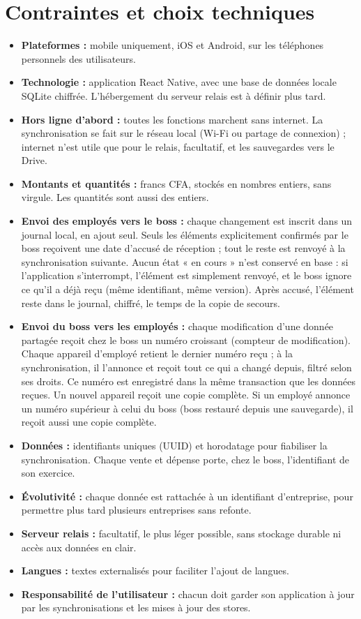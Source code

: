 \documentclass[11pt,a4paper]{article}
\begin{document}
	\section{Contraintes et choix techniques}
	\begin{itemize}[leftmargin=*]
		\item \textbf{Plateformes :} mobile uniquement, iOS et Android, sur les téléphones personnels des utilisateurs.
		\item \textbf{Technologie :} application React Native, avec une base de données locale SQLite chiffrée. L'hébergement du serveur relais est à définir plus tard.
		\item \textbf{Hors ligne d'abord :} toutes les fonctions marchent sans internet. La synchronisation se fait sur le réseau local (Wi-Fi ou partage de connexion) ; internet n'est utile que pour le relais, facultatif, et les sauvegardes vers le Drive.
		\item \textbf{Montants et quantités :} francs CFA, stockés en nombres entiers, sans virgule. Les quantités sont aussi des entiers.
		\item \textbf{Envoi des employés vers le boss :} chaque changement est inscrit dans un journal local, en ajout seul. Seuls les éléments explicitement confirmés par le boss reçoivent une date d'accusé de réception ; tout le reste est renvoyé à la synchronisation suivante. Aucun état « en cours » n'est conservé en base : si l'application s'interrompt, l'élément est simplement renvoyé, et le boss ignore ce qu'il a déjà reçu (même identifiant, même version). Après accusé, l'élément reste dans le journal, chiffré, le temps de la copie de secours.
		\item \textbf{Envoi du boss vers les employés :} chaque modification d'une donnée partagée reçoit chez le boss un numéro croissant (compteur de modification). Chaque appareil d'employé retient le dernier numéro reçu ; à la synchronisation, il l'annonce et reçoit tout ce qui a changé depuis, filtré selon ses droits. Ce numéro est enregistré dans la même transaction que les données reçues. Un nouvel appareil reçoit une copie complète. Si un employé annonce un numéro supérieur à celui du boss (boss restauré depuis une sauvegarde), il reçoit aussi une copie complète.
		\item \textbf{Données :} identifiants uniques (UUID) et horodatage pour fiabiliser la synchronisation. Chaque vente et dépense porte, chez le boss, l'identifiant de son exercice.
		\item \textbf{Évolutivité :} chaque donnée est rattachée à un identifiant d'entreprise, pour permettre plus tard plusieurs entreprises sans refonte.
		\item \textbf{Serveur relais :} facultatif, le plus léger possible, sans stockage durable ni accès aux données en clair.
		\item \textbf{Langues :} textes externalisés pour faciliter l'ajout de langues.
		\item \textbf{Responsabilité de l'utilisateur :} chacun doit garder son application à jour par les synchronisations et les mises à jour des stores.
	\end{itemize}
\end{document}
